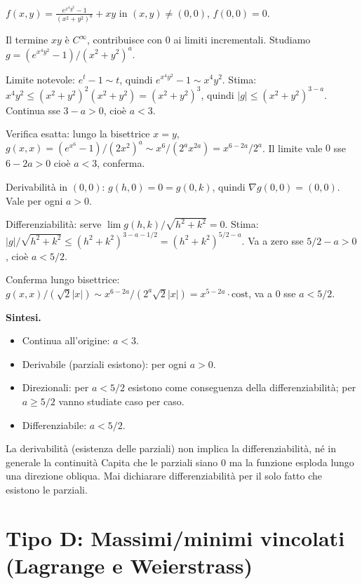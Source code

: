 \documentclass[11pt,a4paper,openany]{book}
\theoremstyle{plain}
\theoremstyle{definition}
\theoremstyle{remark}
\begin{document}
\begin{esempio}[title={10/2/2022 --- al variare di $a>0$}]
$\displaystyle f(x,y)=\frac{e^{x^4y^2}-1}{(x^2+y^2)^a}+xy$ in $(x,y)\ne(0,0)$,
$f(0,0)=0$.

Il termine $xy$ \`e $C^\infty$, contribuisce con $0$ ai limiti
incrementali. Studiamo $g=(e^{x^4y^2}-1)/(x^2+y^2)^a$.

Limite notevole: $e^t-1\sim t$, quindi $e^{x^4y^2}-1\sim x^4y^2$.
Stima: $x^4y^2\le(x^2+y^2)^2(x^2+y^2)=(x^2+y^2)^3$, quindi
$|g|\le(x^2+y^2)^{3-a}$. Continua sse $3-a>0$, cio\`e $a<3$.

Verifica esatta: lungo la bisettrice $x=y$, $g(x,x)=(e^{x^6}-1)/(2x^2)^a\sim
x^6/(2^a x^{2a})=x^{6-2a}/2^a$. Il limite vale $0$ sse $6-2a>0$ cio\`e
$a<3$, conferma.

Derivabilit\`a in $(0,0)$: $g(h,0)=0=g(0,k)$, quindi
$\nabla g(0,0)=(0,0)$. Vale per ogni $a>0$.

Differenziabilit\`a: serve
$\lim g(h,k)/\sqrt{h^2+k^2}=0$. Stima:
$|g|/\sqrt{h^2+k^2}\le(h^2+k^2)^{3-a-1/2}=(h^2+k^2)^{5/2-a}$.
Va a zero sse $5/2-a>0$, cio\`e $a<5/2$.

Conferma lungo bisettrice: $g(x,x)/(\sqrt2|x|)\sim x^{6-2a}/(2^a\sqrt2|x|)=
x^{5-2a}\cdot\text{cost}$, va a 0 sse $a<5/2$.

\textbf{Sintesi.}
\begin{itemize}
\item Continua all'origine: $a<3$.
\item Derivabile (parziali esistono): per ogni $a>0$.
\item Direzionali: per $a<5/2$ esistono come conseguenza della
differenziabilit\`a; per $a\ge 5/2$ vanno studiate caso per caso.
\item Differenziabile: $a<5/2$.
\end{itemize}
\end{esempio}

\begin{trappola}
La derivabilit\`a (esistenza delle parziali) non implica la
differenziabilit\`a, n\'e in generale la continuit\`a\! Capita che le
parziali siano $0$ ma la funzione esploda lungo una direzione obliqua.
Mai dichiarare differenziabilit\`a per il solo fatto che esistono le
parziali.
\end{trappola}

\section{Tipo D: Massimi/minimi vincolati (Lagrange e Weierstrass)}
\end{document}
